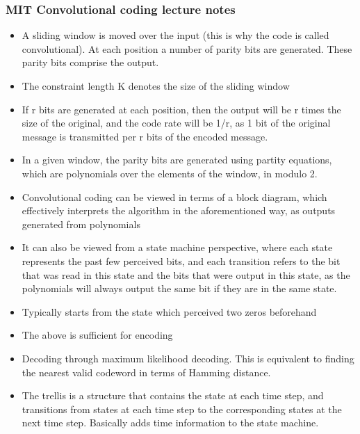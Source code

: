 \documentclass{article}
\begin{document}
\subsubsection{MIT Convolutional coding lecture notes}

\begin{itemize}
\item A sliding window is moved over the input (this is why the code is called convolutional). At each position a number of parity bits are generated. These parity bits comprise the output.

\item The constraint length K denotes the size of the sliding window

\item If r bits are generated at each position, then the output will be r times
the size of the original, and the code rate will be 1/r, as 1 bit of the
original message is transmitted per r bits of the encoded message.

\item In a given window, the parity bits are generated using partity equations,
which are polynomials over the elements of the window, in modulo 2.

\item Convolutional coding can be viewed in terms of a block diagram, which
effectively interprets the algorithm in the aforementioned way, as outputs
generated from polynomials

\item It can also be viewed from a state machine perspective, where each state
represents the past few perceived bits, and each transition refers to the
bit that was read in this state and the bits that were output in this
state, as the polynomials will always output the same bit if they are in
the same state.

\item Typically starts from the state which perceived two zeros beforehand

\item The above is sufficient for encoding

\item Decoding through maximum likelihood decoding. This is equivalent to
finding the nearest valid codeword in terms of Hamming distance.

\item The trellis is a structure that contains the state at each time step,
and transitions from states at each time step to the corresponding states
at the next time step. Basically adds time information to the state
machine.


\end{itemize}
\end{document}
